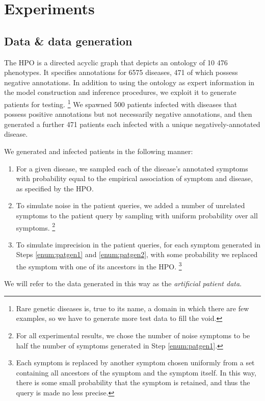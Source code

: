 \section{Experiments}
\label{sec:exp}

\subsection{Data \& data generation}

The HPO \cite{kohler2014hpo} is a directed acyclic graph that depicts an
ontology of 10 476 phenotypes.
%
It specifies annotations for 6575 diseases, 471 of which possess negative
annotations.
%
In addition to using the ontology as expert information in the model
construction and inference procedures, we exploit it to generate patients
for testing.
%
\footnote{
    Rare genetic diseases is, true to its name, a domain in which there are few
    examples, so we have to generate more test data to fill the void.
}
%
We spawned 500 patients infected with diseases that
possess positive annotations but not necessarily negative annotations, and then
generated a further 471 patients each infected with a unique
negatively-annotated disease.

We generated and infected patients in the following manner:
%
\begin{enumerate}
    \item \label{enum:patgen1}
        For a given disease, we sampled each of the disease's annotated
        symptoms with probability equal to the empirical association of symptom
        and disease, as specified by the HPO.
    \item \label{enum:patgen2}
        To simulate noise in the patient queries, we added a number
        of unrelated symptoms to the patient query by sampling with uniform
        probability over all symptoms.
        \footnote{
            For all experimental results, we chose the number of noise symptoms
            to be half the number of symptoms generated in Step
            \ref{enum:patgen1}.
        }
    \item To simulate imprecision in the patient queries, for each symptom
        generated in Steps \ref{enum:patgen1} and \ref{enum:patgen2}, with some
        probability we replaced the symptom with one of its ancestors in the
        HPO.
        \footnote{
            Each symptom is replaced by another symptom chosen uniformly from a
            set containing all ancestors of the symptom and the symptom itself.
            In this way, there is some small probability that the symptom is
            retained, and thus the query is made no less precise.
        }
\end{enumerate}
%
We will refer to the data generated in this way as the {\it artificial patient
data}.

